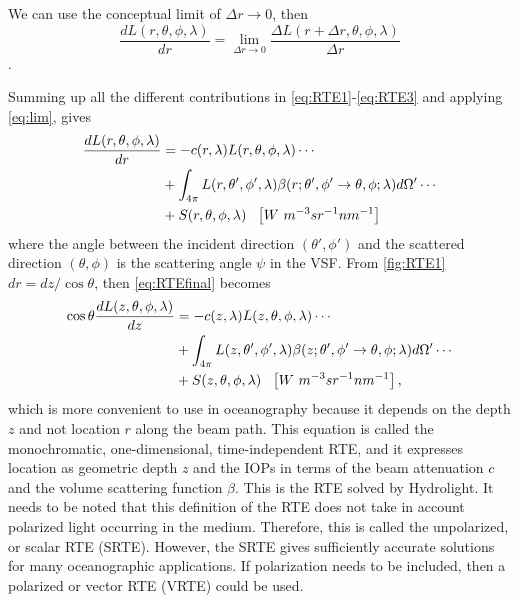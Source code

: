 We can use the conceptual limit of $\Delta r\rightarrow 0$, then
\begin{equation}\label{eq:lim}
  \frac{dL(r,\theta,\phi,\lambda)}{dr} = \lim_{\Delta r \to 0} \frac{\Delta L(r+\Delta r,\theta,\phi,\lambda)}{\Delta r}
\end{equation}. 

Summing up all the different contributions in \autoref{eq:RTE1}-\ref{eq:RTE3} and applying \autoref{eq:lim}, gives
\begin{align}\label{eq:RTEfinal}
  \frac{dL(r,\theta,\phi,\lambda)}{dr}&=-c(r,\lambda)L(r,\theta,\phi,\lambda)\cdots \notag \\
  &+\int_{4\pi} L(r,\theta',\phi',\lambda)\beta(r;\theta',\phi' \to \theta,\phi;\lambda)d\Omega'\cdots \notag  \\
  &+S(r,\theta,\phi,\lambda)~~\left[W~m^{-3}sr^{-1}nm^{-1} \right]
\end{align}
where the angle between the incident direction $(\theta',\phi')$ and the scattered direction $(\theta,\phi)$ is the scattering angle $\psi$ in the VSF. From \autoref{fig:RTE1} $dr=dz/\cos{\theta}$, then \autoref{eq:RTEfinal} becomes
\begin{align}\label{eq:RTEfinal2}
  \cos\theta\frac{dL(z,\theta,\phi,\lambda)}{dz}&=-c(z,\lambda)L(z,\theta,\phi,\lambda)\cdots \notag \\
  &+\int_{4\pi} L(z,\theta',\phi',\lambda)\beta(z;\theta',\phi' \to \theta,\phi;\lambda)d\Omega'\cdots \notag  \\
  &+S(z,\theta,\phi,\lambda)~~\left[W~m^{-3}sr^{-1}nm^{-1} \right],
\end{align}
which is more convenient to use in oceanography because it depends on the depth $z$ and not location $r$ along the beam path. This equation is called the monochromatic, one-dimensional, time-independent RTE, and it expresses location as geometric depth $z$ and the IOPs in terms of the beam attenuation $c$ and the volume scattering function $\beta$. This is the RTE solved by Hydrolight. It needs to be noted that this definition of the RTE does not take in account polarized light occurring in the medium. Therefore, this is called the unpolarized, or scalar RTE (SRTE). However, the SRTE gives sufficiently accurate solutions for many oceanographic applications. If polarization needs to be included, then a polarized or vector RTE (VRTE) could be used.

